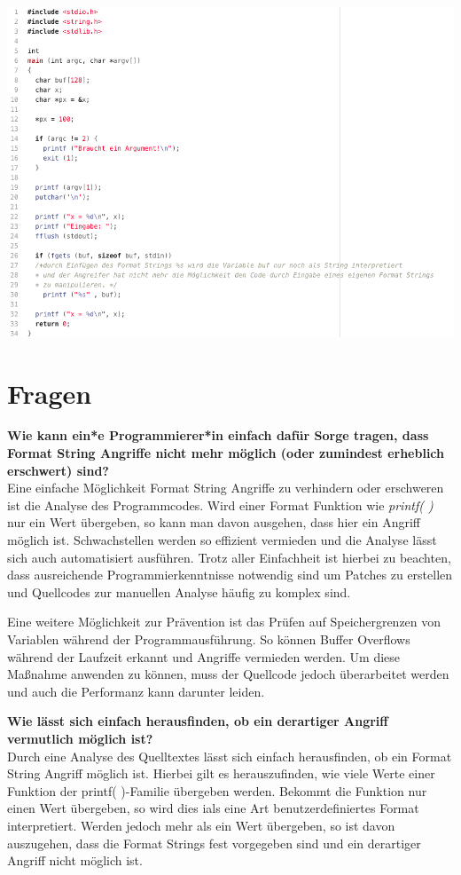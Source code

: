 \documentclass[12pt,a4paper]{article}
\begin{document}
\begin{center}
	\includegraphics[scale=0.3]{betterCode.png}
\end{center}
	
	\section*{Fragen}
	\textbf{Wie kann ein*e Programmierer*in einfach dafür Sorge tragen, dass Format String Angriffe nicht mehr möglich (oder zumindest erheblich erschwert) sind?} \\
	Eine einfache Möglichkeit Format String Angriffe zu verhindern oder erschweren ist die Analyse des Programmcodes. Wird einer Format Funktion wie \textit{printf( )} nur ein Wert übergeben, so kann man davon ausgehen, dass hier ein Angriff möglich ist. Schwachstellen werden so effizient vermieden und die Analyse lässt sich auch automatisiert ausführen. Trotz aller Einfachheit ist hierbei zu beachten, dass ausreichende Programmierkenntnisse notwendig sind um Patches zu erstellen und Quellcodes zur manuellen Analyse häufig zu komplex sind. 
	\bigskip

	Eine weitere Möglichkeit zur Prävention ist das Prüfen auf Speichergrenzen von Variablen während der Programmausführung. So können Buffer Overflows während der Laufzeit erkannt und Angriffe vermieden werden. Um diese Maßnahme anwenden zu können, muss der Quellcode jedoch überarbeitet werden und auch die Performanz kann darunter leiden.
	\bigskip
	
	\textbf{Wie lässt sich einfach herausfinden, ob ein derartiger Angriff vermutlich möglich ist?} \\
	Durch eine Analyse des Quelltextes lässt sich einfach herausfinden, ob ein Format String Angriff möglich ist. Hierbei gilt es herauszufinden, wie viele Werte einer Funktion der printf( )-Familie übergeben werden. Bekommt die Funktion nur einen Wert übergeben, so wird dies ials eine Art benutzerdefiniertes Format interpretiert. Werden jedoch mehr als ein Wert übergeben, so ist davon auszugehen, dass die Format Strings fest vorgegeben sind und ein derartiger Angriff nicht möglich ist. 
	\bigskip
	
	
\end{document}
